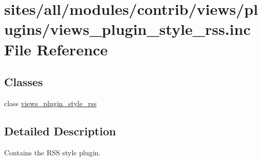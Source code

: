 \hypertarget{views__plugin__style__rss_8inc}{
\section{sites/all/modules/contrib/views/plugins/views\_\-plugin\_\-style\_\-rss.inc File Reference}
\label{views__plugin__style__rss_8inc}
}
\subsection*{Classes}
\begin{CompactItemize}
\item 
class \hyperlink{classviews__plugin__style__rss}{views\_\-plugin\_\-style\_\-rss}
\end{CompactItemize}


\subsection{Detailed Description}
Contains the RSS style plugin. 